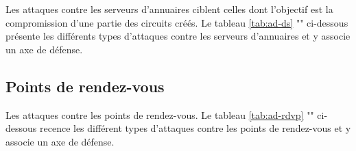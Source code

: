 Les attaques contre les serveurs d'annuaires ciblent celles dont l'objectif est la compromission d'une partie des circuits créés.
Le tableau \ref{tab:ad-ds} "" ci-dessous présente les différents types d'attaques contre les serveurs d'annuaires et y associe un axe de défense.


\subsection{Points de rendez-vous}\label{subsubsec:rdv}

Les attaques contre les points de rendez-vous.
Le tableau \ref{tab:ad-rdvp} "" ci-dessous recence les différent types d'attaques contre les points de rendez-vous et y associe un axe de défense.
